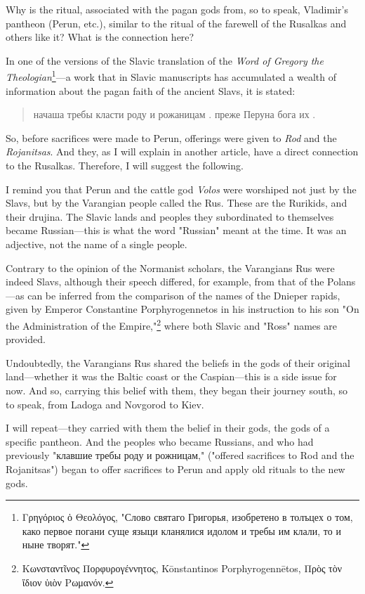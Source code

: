 \documentclass[a5paper,11pt,openany]{article}
\begin{document}
Why is the ritual, associated with the pagan gods from, so to speak, Vladimir's pantheon (Perun, etc.), similar to the ritual of the farewell of the Rusalkas and others like it? What is the connection here?

In one of the versions of the Slavic translation of the \textit{Word of Gregory the Theologian}\footnote{Γρηγόριος ὁ Θεολόγος, "Слово святаго Григорья, изобретено в толъцех о том, како первое погани суще языци кланялися идолом и требы им клали, то и ныне творят."}—a work that in Slavic manuscripts has accumulated a wealth of information about the pagan faith of the ancient Slavs, it is stated:

\begin{quotation}
\noindent начаша требы класти роду и рожаницам . преже Перуна бога их .
\end{quotation}

So, before sacrifices were made to Perun, offerings were given to \textit{Rod} and the \textit{Rojanitsas}. And they, as I will explain in another article, have a direct connection to the Rusalkas. Therefore, I will suggest the following.

I remind you that Perun and the cattle god \textit{Volos} were worshiped not just by the Slavs, but by the Varangian people called the Rus. These are the Rurikids, and their drujina. The Slavic lands and peoples they subordinated to themselves became Russian—this is what the word "Russian" meant at the time. It was an adjective, not the name of a single people.

Contrary to the opinion of the Normanist scholars, the Varangians Rus were indeed Slavs, although their speech differed, for example, from that of the Polans—as can be inferred from the comparison of the names of the Dnieper rapids, given by Emperor Constantine Porphyrogennetos in his instruction to his son "On the Administration of the Empire,"\footnote{Κωνσταντῖνος Πορφυρογέννητος, Kōnstantinos Porphyrogennētos, Πρὸς τὸν ἴδιον ὑιὸν Ρωμανόν.} where both Slavic and "Ross" names are provided.

Undoubtedly, the Varangians Rus shared the beliefs in the gods of their original land—whether it was the Baltic coast or the Caspian—this is a side issue for now. And so, carrying this belief with them, they began their journey south, so to speak, from Ladoga and Novgorod to Kiev.

I will repeat—they carried with them the belief in their gods, the gods of a specific pantheon. And the peoples who became Russians, and who had previously "клавшие требы роду и рожницам," ("offered sacrifices to Rod and the Rojanitsas") began to offer sacrifices to Perun and apply old rituals to the new gods.
\end{document}
